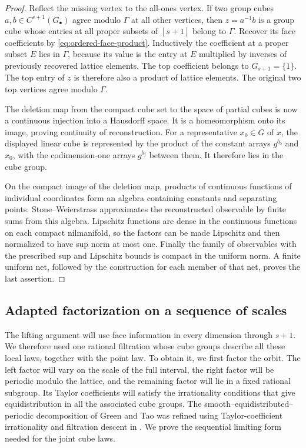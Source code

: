 \begin{proof}
Reflect the missing vertex to the all-ones vertex.  If two group cubes
$a,b\in C^{s+1}(G_\bullet)$ agree modulo $\Gamma$ at all other vertices,
then $z=a^{-1}b$ is a group cube whose entries at all proper subsets of
$[s+1]$ belong to $\Gamma$.  Recover its face coefficients by
\eqref{eq:ordered-face-product}.  Inductively the coefficient at a proper
subset $E$ lies in $\Gamma$, because its value is the entry at $E$
multiplied by inverses of previously recovered lattice elements.  The top
coefficient belongs to $G_{s+1}=\{1\}$.  The top entry of $z$ is therefore
also a product of lattice elements.  The original two top vertices agree
modulo $\Gamma$.

The deletion map from the compact cube set to the space of partial cubes
is now a continuous injection into a Hausdorff space.  It is a homeomorphism
onto its image, proving continuity of reconstruction.  For a representative
$x_0\in G$ of $x$, the displayed linear cube is represented by the product
of the constant arrays $g^{b_0}$ and $x_0$, with the codimension-one
arrays $g^{b_j}$ between them.  It therefore lies in the cube group.

On the compact image of the deletion map, products of continuous functions
of individual coordinates form an algebra containing constants and
separating points.  Stone--Weierstrass approximates the reconstructed
observable by finite sums from this algebra.  Lipschitz functions are dense
in the continuous functions on each compact nilmanifold, so the factors
can be made Lipschitz and then normalized to have sup norm at most one.
Finally the family of observables with the prescribed sup and Lipschitz
bounds is compact in the uniform norm.  A finite uniform net, followed by
the construction for each member of that net, proves the last assertion.
\end{proof}

\subsection{Adapted factorization on a sequence of scales}

The lifting argument will use face information in every dimension
through $s+1$.  We therefore need one rational filtration whose cube
groups describe all these local laws, together with the point law.
To obtain it, we first factor the orbit.  The left factor will vary
on the scale of the full interval, the right factor will be periodic
modulo the lattice, and the remaining factor will lie in a fixed
rational subgroup.  Its Taylor coefficients will satisfy the
irrationality conditions that give equidistribution in all the
associated cube groups.
The smooth--equidistributed--periodic decomposition of Green and Tao
\cite[Theorem~1.19]{GreenTao} was refined using Taylor-coefficient
irrationality and filtration descent in
\cite[Definitions~A.5--A.6 and Lemma~2.9]{GreenTaoRegularity}.
We prove the sequential limiting form needed for the joint cube laws.

